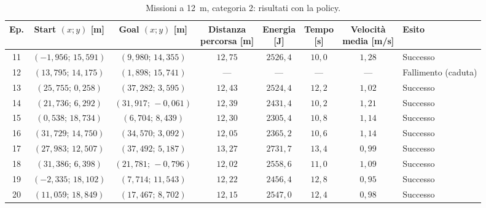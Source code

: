 \begin{table}[H]
\centering
\caption{Missioni a 12~m, categoria 2: risultati con la policy.}
\label{tab:big-map-12m-cat2}
\begingroup
\fontsize{9}{11}\selectfont
\setlength{\tabcolsep}{2.5pt}
\renewcommand{\arraystretch}{1.2}
\begin{tabular}{@{}c cc cccc l@{}}
\toprule
Ep. & \shortstack{Start $(x;y)$\\{}[m]} & \shortstack{Goal $(x;y)$\\{}[m]} & \shortstack{Distanza\\percorsa [m]} & \shortstack{Energia\\{}[J]} & \shortstack{Tempo\\{}[s]} & \shortstack{Velocità\\media [m/s]} & Esito \\
\midrule
11 & $(-1{,}956;\,15{,}591)$ & $(9{,}980;\,14{,}355)$ & $12{,}75$ & $2526{,}4$ & $10{,}0$ & $1{,}28$ & Successo \\
12 & $(13{,}795;\,14{,}175)$ & $(1{,}898;\,15{,}741)$ & --- & --- & --- & --- & Fallimento (caduta) \\
13 & $(25{,}755;\,0{,}258)$ & $(37{,}282;\,3{,}595)$ & $12{,}43$ & $2524{,}4$ & $12{,}2$ & $1{,}02$ & Successo \\
14 & $(21{,}736;\,6{,}292)$ & $(31{,}917;\,-0{,}061)$ & $12{,}39$ & $2431{,}4$ & $10{,}2$ & $1{,}21$ & Successo \\
15 & $(0{,}538;\,18{,}734)$ & $(6{,}704;\,8{,}439)$ & $12{,}30$ & $2305{,}4$ & $10{,}8$ & $1{,}14$ & Successo \\
16 & $(31{,}729;\,14{,}750)$ & $(34{,}570;\,3{,}092)$ & $12{,}05$ & $2365{,}2$ & $10{,}6$ & $1{,}14$ & Successo \\
17 & $(27{,}983;\,12{,}507)$ & $(37{,}492;\,5{,}187)$ & $13{,}27$ & $2731{,}7$ & $13{,}4$ & $0{,}99$ & Successo \\
18 & $(31{,}386;\,6{,}398)$ & $(21{,}781;\,-0{,}796)$ & $12{,}02$ & $2558{,}6$ & $11{,}0$ & $1{,}09$ & Successo \\
19 & $(-2{,}335;\,18{,}102)$ & $(7{,}714;\,11{,}543)$ & $12{,}22$ & $2456{,}4$ & $12{,}8$ & $0{,}95$ & Successo \\
20 & $(11{,}059;\,18{,}849)$ & $(17{,}467;\,8{,}702)$ & $12{,}15$ & $2547{,}0$ & $12{,}4$ & $0{,}98$ & Successo \\
\bottomrule
\end{tabular}
\endgroup
\end{table}

